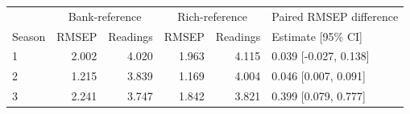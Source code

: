 \begin{tabular}{lrrrrl}
\toprule
& \multicolumn{2}{c}{Bank-reference} & \multicolumn{2}{c}{Rich-reference} & Paired RMSEP difference \\
Season & RMSEP & Readings & RMSEP & Readings & Estimate [95\% CI] \\
\midrule
1 & 2.002 & 4.020 & 1.963 & 4.115 & 0.039 [-0.027, 0.138] \\
2 & 1.215 & 3.839 & 1.169 & 4.004 & 0.046 [0.007, 0.091] \\
3 & 2.241 & 3.747 & 1.842 & 3.821 & 0.399 [0.079, 0.777] \\
\bottomrule
\end{tabular}
